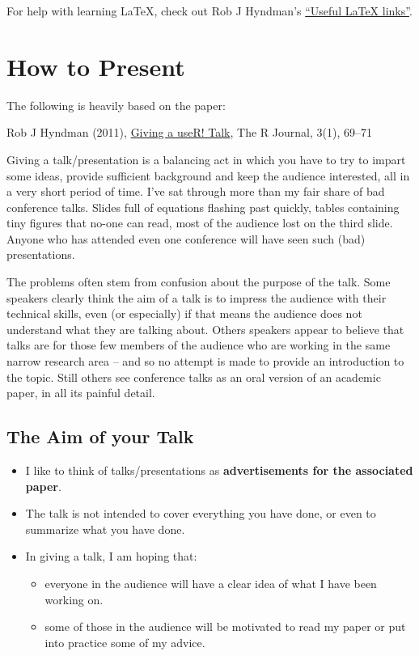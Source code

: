 \documentclass[]{book}
\providecommand{\tightlist}{%
  \setlength{\itemsep}{0pt}\setlength{\parskip}{0pt}}
\theoremstyle{definition}
\theoremstyle{definition}
\theoremstyle{definition}
\theoremstyle{remark}
\begin{document}
For help with learning LaTeX, check out Rob J Hyndman's \href{https://robjhyndman.com/hyndsight/useful-latex-links/}{``Useful LaTeX links''}.

\hypertarget{how-to-present}{%
\chapter{How to Present}\label{how-to-present}}

The following is heavily based on the paper:

Rob J Hyndman (2011), \href{https://journal.r-project.org/archive/2011-1/RJournal_2011-1_Hyndman.pdf}{Giving a useR! Talk}, The R Journal, 3(1), 69--71

Giving a talk/presentation is a balancing act in which you have to try to impart some ideas, provide sufficient background and keep the audience interested, all in a very short period of time. I've sat through more than my fair share of bad conference talks. Slides full of equations flashing past quickly, tables containing tiny figures that no-one can read, most of the audience lost on the third slide. Anyone who has attended even one conference will have seen such (bad) presentations.

The problems often stem from confusion about the
purpose of the talk. Some speakers clearly think the
aim of a talk is to impress the audience with their
technical skills, even (or especially) if that means the
audience does not understand what they are talking
about. Others speakers appear to believe that talks
are for those few members of the audience who are
working in the same narrow research area -- and so
no attempt is made to provide an introduction to the
topic. Still others see conference talks as an oral version
of an academic paper, in all its painful detail.

\hypertarget{the-aim-of-your-talk}{%
\section{The Aim of your Talk}\label{the-aim-of-your-talk}}

\begin{itemize}
\tightlist
\item
  I like to think of talks/presentations as \textbf{advertisements for the associated paper}.
\item
  The talk is not intended to cover everything you have done, or even to summarize what you have done.
\item
  In giving a talk, I am hoping that:

  \begin{itemize}
  \tightlist
  \item
    everyone in the audience will have a clear idea of what I have been working on.
  \item
    some of those in the audience will be motivated to read my paper or put into practice some of my advice.
  \end{itemize}
\end{itemize}
\end{document}
